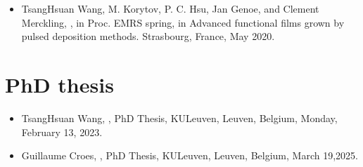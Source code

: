 \documentclass[a4paper,10pt,english,openany,oneside]{jupyterBook}
\begin{document}
\begin{itemize}
\item {} 
\sphinxAtStartPar
Tsang\sphinxhyphen{}Hsuan Wang,
M. Korytov,
P. C. Hsu,
Jan Genoe, and
Clement Merckling,
,
in Proc. E\sphinxhyphen{}MRS  spring, in Advanced functional films grown by pulsed deposition methods. Strasbourg, France, May 2020. 

\end{itemize}


\section{PhD thesis}
\label{\detokenize{Publications2:phd-thesis}}\label{\detokenize{Publications2:thesis-target}}\begin{itemize}
\item {} 
\sphinxAtStartPar
Tsang\sphinxhyphen{}Hsuan Wang,
,
PhD Thesis, KULeuven, Leuven, Belgium, Monday, February 13, 2023.

\item {} 
\sphinxAtStartPar
Guillaume Croes,
,
PhD Thesis, KULeuven, Leuven, Belgium, March 19,2025.

\end{itemize}

\sphinxstepscope
\end{document}
